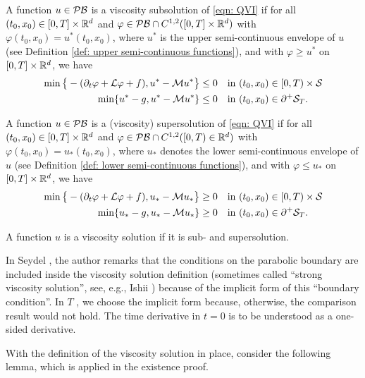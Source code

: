 \begin{definition}
\label{def: Definition 4.1 in Seydel (Viscosity solution)}
    A function $u \in \mathcal{PB}$ is a viscosity subsolution of \eqref{eqn: QVI} if for all $(t_0,x_0) \in [0,T] \times \mathbb{R}^d$ and $\varphi \in \mathcal{PB} \cap C^{1,2}([0,T]\times \mathbb{R}^d)$ with $\varphi(t_0,x_0) = u^*(t_0,x_0)$, where $u^*$ is the upper semi-continuous envelope of $u$ (see Definition \ref{def: upper semi-continuous functions}), and with $\varphi \geq u^*$ on $[0,T] \times \mathbb{R}^d$, we have
    \begin{align*}
        \min \big\{-(\partial_t \varphi + \mathcal{L} \varphi + f), u^* - \mathcal{M} u^* \big\} \leq 0 & \quad \text{in } (t_0,x_0) \in [0,T) \times \mathcal{S} \\
        \min \{ u^*-g, u^* - \mathcal{M} u^* \} \leq 0 & \quad \text{in } (t_0,x_0) \in \partial^+ \mathcal{S}_T.
    \end{align*}
    
    A function $u \in \mathcal{PB}$ is a (viscosity) supersolution of \eqref{eqn: QVI} if for all $(t_0,x_0) \in [0,T] \times \mathbb{R}^d$ and $\varphi \in \mathcal{PB} \cap C^{1,2}([0,T) \in \mathbb{R}^d)$ with $\varphi(t_0,x_0) = u_*(t_0,x_0)$, where $u_*$ denotes the lower semi-continuous envelope of $u$ (see Definition \ref{def: lower semi-continuous functions}), and with $\varphi \leq u_*$ on $[0,T] \times \mathbb{R}^d$, we have
    \begin{align*}
        \min \big\{-(\partial_t \varphi + \mathcal{L} \varphi + f), u_* - \mathcal{M} u_* \big\} \geq 0 & \quad \text{in } (t_0,x_0) \in [0,T) \times \mathcal{S} \\
        \min \{ u_*-g, u_* - \mathcal{M} u_* \} \geq 0 & \quad \text{in } (t_0,x_0) \in \partial^+ \mathcal{S}_T.
    \end{align*}

    A function $u$ is a viscosity solution if it is sub- and supersolution. 
\end{definition}
\begin{remark}
    In Seydel \cite{seydel2010generalexistenceuniquenessviscosity}, the author remarks that the conditions on the parabolic boundary are included inside the viscosity solution definition (sometimes called ``strong viscosity solution'', see, e.g., Ishii \cite{ishii1993viscosity}) because of the implicit form of this ``boundary condition''. In $T$ , we choose the implicit form because, otherwise, the comparison result would not hold. The time derivative in $t = 0$ is to be understood as a one-sided derivative.
\end{remark}
With the definition of the viscosity solution in place, consider the following lemma, which is applied in the existence proof. 


